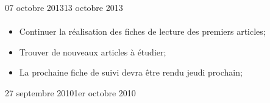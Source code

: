 \documentclass[11pt, french]{report-rd-info}
\begin{document}
\begin{fichesuivi}{07 octobre 2013}{13 octobre 2013}
\paragraph{}
	\begin{planification}
		\begin{itemize}
			\item Continuer la réalisation des fiches de lecture des premiers articles;
		\item Trouver de nouveaux articles à étudier;
			\item La prochaine fiche de suivi devra être rendu jeudi prochain;
		\end{itemize}
	\end{planification}
\end{fichesuivi}


\begin{fichesuivi}{27 septembre 2010}{1er octobre 2010}

	\begin{travaileffectue}
	\end{travaileffectue}

	\begin{travailnoneffectue}
	\end{travailnoneffectue}

	\begin{echange}
	\end{echange}

	\begin{planification}
	\end{planification}
\end{fichesuivi}

\begin{fichesuivi}{}{}

	\begin{travaileffectue}
	\end{travaileffectue}

	\begin{travailnoneffectue}
	\end{travailnoneffectue}

	\begin{echange}
	\end{echange}

	\begin{planification}
	\end{planification}
\end{fichesuivi}
\end{document}
